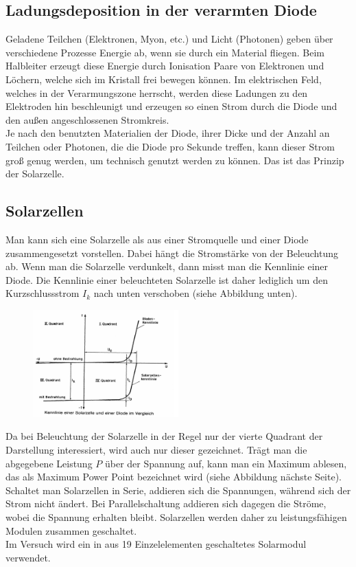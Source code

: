 \subsection{Ladungsdeposition in der verarmten Diode}

Geladene Teilchen (Elektronen, Myon, etc.) und Licht (Photonen) geben über verschiedene Prozesse Energie ab, wenn sie durch ein Material fliegen. Beim Halbleiter erzeugt diese Energie durch Ionisation Paare von Elektronen und Löchern, welche sich im Kristall frei bewegen können. Im elektrischen Feld, welches in der Verarmungszone herrscht, werden diese Ladungen zu den Elektroden hin beschleunigt und erzeugen so einen Strom durch die Diode und den außen angeschlossenen Stromkreis.\\
Je nach den benutzten Materialien der Diode, ihrer Dicke und der Anzahl an Teilchen oder Photonen, die die Diode pro Sekunde treffen, kann dieser Strom groß genug werden, um technisch genutzt werden zu können. Das ist das Prinzip der Solarzelle.

\subsection{Solarzellen}

Man kann sich eine Solarzelle als aus einer Stromquelle und einer Diode zusammengesetzt vorstellen. Dabei hängt die Stromstärke von der Beleuchtung ab. Wenn man die Solarzelle verdunkelt, dann misst man die Kennlinie einer Diode. Die Kennlinie einer beleuchteten Solarzelle ist daher lediglich um den Kurzschlussstrom $I_k$ nach unten verschoben (siehe Abbildung unten).\\ %
\begin{figure}[h]
	\centering
		\includegraphics[width=0.5\textwidth]{Versuch_17-18/Abbildungen/Kennlinienfeld.jpg}
	\label{fig:Kennlinienfeld}
\end{figure}

Da bei Beleuchtung der Solarzelle in der Regel nur der vierte Quadrant der Darstellung interessiert, wird auch nur dieser gezeichnet. Trägt man die abgegebene Leistung $P$ über der Spannung auf, kann man ein Maximum ablesen, das als Maximum Power Point bezeichnet wird (siehe Abbildung nächste Seite).\\ %
Schaltet man Solarzellen in Serie, addieren sich die Spannungen, während sich der Strom nicht ändert. Bei Parallelschaltung addieren sich dagegen die Ströme, wobei die Spannung erhalten bleibt. Solarzellen werden daher zu leistungsfähigen Modulen zusammen geschaltet.\\
Im Versuch wird ein in aus 19 Einzelelementen geschaltetes Solarmodul verwendet.

